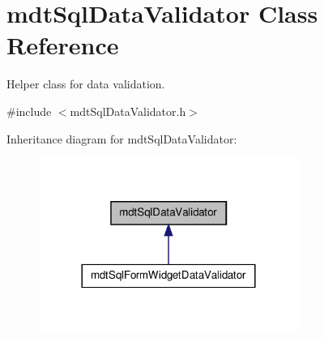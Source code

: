 \hypertarget{classmdt_sql_data_validator}{
\section{mdtSqlDataValidator Class Reference}
\label{classmdt_sql_data_validator}
}


Helper class for data validation.  




{\ttfamily \#include $<$mdtSqlDataValidator.h$>$}



Inheritance diagram for mdtSqlDataValidator:
\nopagebreak
\begin{figure}[H]
\begin{center}
\leavevmode
\includegraphics[width=240pt]{classmdt_sql_data_validator__inherit__graph}
\end{center}
\end{figure}
